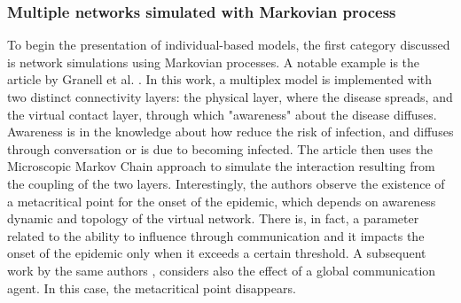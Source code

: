 \subsubsection{Multiple networks simulated with Markovian process}
To begin the presentation of individual-based models, the first category discussed is network simulations using Markovian processes. A notable example is the article by Granell et al. \cite{Granell_2014}. In this work, a multiplex model is implemented with two distinct connectivity layers: the physical layer, where the disease spreads, and the virtual contact layer, through which "awareness" about the disease diffuses. Awareness is in the knowledge about how reduce the risk of infection, and diffuses through conversation or is due to becoming infected. The article then uses the Microscopic Markov Chain approach to simulate the interaction resulting from the coupling of the two layers. Interestingly, the authors observe the existence of a metacritical point for the onset of the epidemic, which depends on awareness dynamic and topology of the virtual network. There is, in fact, a parameter related to the ability to influence through communication and it impacts the onset of the epidemic only when it exceeds a certain threshold.
A subsequent work by the same authors \cite{Granell2013}, considers also the effect of a global communication agent. In this case, the metacritical point disappears. 
